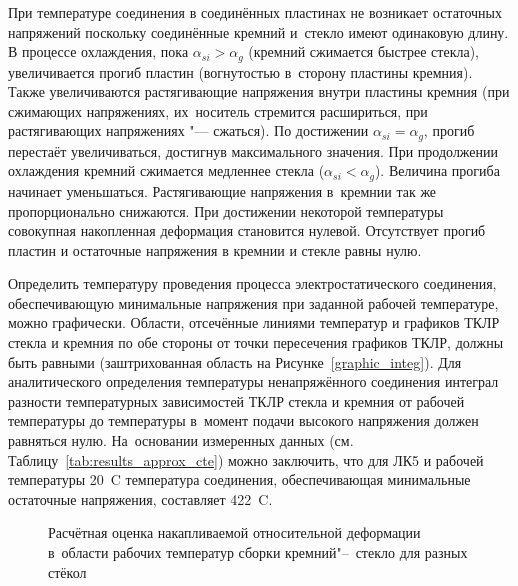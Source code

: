 При температуре соединения
в соединённых пластинах не возникает остаточных напряжений
поскольку соединённые кремний и~стекло имеют одинаковую длину.
В процессе охлаждения, пока \mbox{$\alpha_{si} > \alpha_{g}$}
(кремний сжимается быстрее стекла), увеличивается прогиб пластин (вогнутостью
в~сторону пластины кремния).
Также увеличиваются растягивающие напряжения внутри
пластины кремния (при сжимающих напряжениях, их~носитель стремится расшириться,
при растягивающих напряжениях "--- сжаться).
По достижении \mbox{$\alpha_{si} = \alpha_{g}$},
прогиб перестаёт увеличиваться,
достигнув максимального значения.
При продолжении охлаждения кремний сжимается медленнее стекла
\mbox{($\alpha_{si} < \alpha_{g}$)}.
Величина прогиба начинает уменьшаться.
Растягивающие напряжения в~кремнии так же пропорционально снижаются.
При достижении некоторой температуры совокупная накопленная деформация становится
нулевой. Отсутствует прогиб пластин и остаточные напряжения в кремнии и стекле
равны нулю.

Определить температуру проведения процесса электростатического соединения,
обеспечивающую минимальные напряжения при заданной рабочей температуре, можно
графически. Области, отсечённые линиями температур и графиков ТКЛР стекла и
кремния по обе стороны от точки пересечения графиков ТКЛР, должны быть равными
(заштрихованная область на Рисунке~\ref{graphic_integ}).
Для аналитического определения температуры ненапряжённого соединения
интеграл разности температурных зависимостей ТКЛР стекла и кремния от рабочей
температуры до температуры в~момент подачи высокого напряжения должен равняться
нулю.
На~основании измеренных данных
(см. Таблицу~\ref{tab:results_approx_cte})
можно заключить, что
для ЛК5 и рабочей температуры
20~{\textdegree}C температура соединения, обеспечивающая минимальные остаточные
напряжения, составляет 422~{\textdegree}C.

\setlength\intextsep{1ex}%
\begin{figure}[!hb]%
    \centering
    \caption{Расчётная оценка накапливаемой относительной деформации в~области рабочих температур сборки кремний"--~стекло для разных стёкол}%
    \label{fig:nakop_deform}%
\end{figure}

